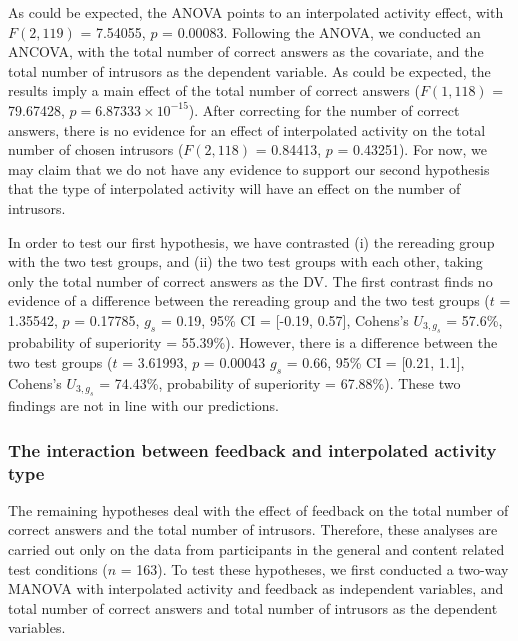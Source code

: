 \documentclass[11pt,]{article}
\begin{document}
As could be expected, the ANOVA points to an interpolated activity
effect, with \(F(2, 119)\) = 7.54055, \(p\) = 0.00083. Following the
ANOVA, we conducted an ANCOVA, with the total number of correct answers
as the covariate, and the total number of intrusors as the dependent
variable. As could be expected, the results imply a main effect of the
total number of correct answers (\(F(1, 118)\) = 79.67428,
\(p = 6.87333\times 10^{-15}\)). After correcting for the number of
correct answers, there is no evidence for an effect of interpolated
activity on the total number of chosen intrusors (\(F (2, 118)\) =
0.84413, \(p\) = 0.43251). For now, we may claim that we do not have any
evidence to support our second hypothesis that the type of interpolated
activity will have an effect on the number of intrusors.

In order to test our first hypothesis, we have contrasted (i) the
rereading group with the two test groups, and (ii) the two test groups
with each other, taking only the total number of correct answers as the
DV. The first contrast finds no evidence of a difference between the
rereading group and the two test groups (\(t\) = 1.35542, \(p\) =
0.17785, \(g_s\) = 0.19, 95\% CI = {[}-0.19, 0.57{]}, Cohens's
\(U_{3, g_s}\) = 57.6\%, probability of superiority = 55.39\%). However,
there is a difference between the two test groups (\(t\) = 3.61993,
\(p\) = 0.00043 \(g_s\) = 0.66, 95\% CI = {[}0.21, 1.1{]}, Cohens's
\(U_{3, g_s}\) = 74.43\%, probability of superiority = 67.88\%). These
two findings are not in line with our predictions.

\hypertarget{the-interaction-between-feedback-and-interpolated-activity-type}{%
\subsubsection{The interaction between feedback and interpolated
activity
type}\label{the-interaction-between-feedback-and-interpolated-activity-type}}

The remaining hypotheses deal with the effect of feedback on the total
number of correct answers and the total number of intrusors. Therefore,
these analyses are carried out only on the data from participants in the
general and content related test conditions (\(n\) = 163). To test these
hypotheses, we first conducted a two-way MANOVA with interpolated
activity and feedback as independent variables, and total number of
correct answers and total number of intrusors as the dependent
variables.
\end{document}
